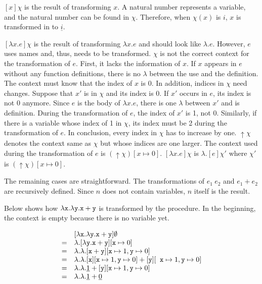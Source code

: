 $[x]\chi$ is the result of transforming $x$. A natural number represents a
variable, and the natural number can be found in $\chi$. Therefore, when
$\chi(x)$ is $i$, $x$ is transformed in to $\underline{i}$.

$[\lambda x.e]\chi$ is the result of transforming $\lambda x.e$ and should look
like $\lambda.e$. However, $e$ uses names and, thus, needs to be transformed.
$\chi$ is not the correct context for the transformation of $e$. First, it lacks
the information of $x$. If $x$ appears in $e$ without any function definitions,
there is no $\lambda$ between the use and the definition. The context must know
that the index of $x$ is 0. In addition, indices in $\chi$ need changes. Suppose
that $x'$ is in $\chi$ and its index is 0. If $x'$ occurs in $e$, its index is
not 0 anymore. Since $e$ is the body of $\lambda x.e$, there is one $\lambda$
between $x'$ and is definition. During the transformation of $e$, the index of
$x'$ is 1, not 0. Similarly, if there is a variable whose index of 1 in $\chi$,
its index must be 2 during the transformation of $e$. In conclusion, every index
in $\chi$ has to increase by one. $\uparrow\chi$ denotes the context same as
$\chi$ but whose indices are one larger. The context used during the
transformation of $e$ is $(\uparrow\chi)[x\mapsto0]$. $[\lambda x.e]\chi$ is
$\lambda.[e]{\chi'}$ where $\chi'$ is $(\uparrow\chi)[x\mapsto0]$.

The remaining cases are straightforward. The transformations of $e_1\ e_2$ and
$e_1+e_2$ are recursively defined. Since $n$ does not contain variables, $n$
itself is the result.

Below shows how $\lambda \texttt{x}.\lambda \texttt{y}.\texttt{x}+\texttt{y}$ is transformed
by the procedure. In the beginning, the context is empty because there is no
variable yet.

\[
\begin{array}{cl}
& [\lambda \texttt{x}.\lambda \texttt{y}.\texttt{x}+\texttt{y}]\emptyset \\
= & \lambda.[\lambda \texttt{y}.\texttt{x}+\texttt{y}][\texttt{x}\mapsto 0] \\
= & \lambda.\lambda.[\texttt{x}+\texttt{y}][\texttt{x}\mapsto 1,\texttt{y}\mapsto 0] \\
= & \lambda.\lambda.[\texttt{x}][\texttt{x}\mapsto 1,\texttt{y}\mapsto 0]+[\texttt{y}][\texttt{
x}\mapsto 1,\texttt{y}\mapsto 0] \\
= & \lambda.\lambda.\underline{1}+[\texttt{y}][\texttt{x}\mapsto 1,\texttt{y}\mapsto 0] \\
= & \lambda.\lambda.\underline{1}+\underline{0} \\
\end{array}
\]

